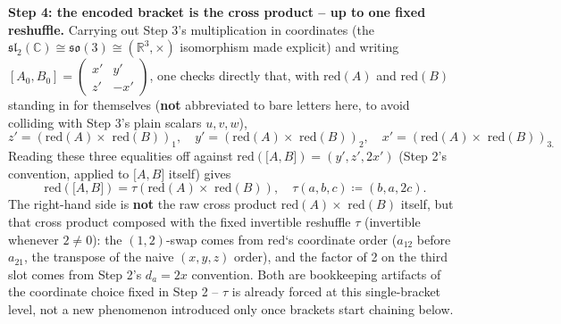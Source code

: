 \documentclass[a4paper,11pt]{scrartcl}
\begin{document}
\textbf{Step 4: the encoded bracket is the cross product -- up to one fixed reshuffle.} Carrying out Step 3's multiplication in coordinates (the \(\mathfrak{sl}_{2}({\mathbb{C}}) \cong \mathfrak{so}(3) \cong \left( \mathbb{R}^{3}, \times \right)\) isomorphism made explicit) and writing \(\left\lbrack A_{0},B_{0} \right\rbrack = \begin{pmatrix}
x' & y' \\
z' & - x'
\end{pmatrix}\), one checks directly that, with \(\text{red}(A)\) and \(\text{red}(B)\) standing in for themselves (\textbf{not} abbreviated to bare letters here, to avoid colliding with Step 3's plain scalars \(u,v,w\)), \[z' = \left( \text{red}(A) \times \text{ red}(B) \right)_{1},\quad y' = \left( \text{red}(A) \times \text{ red}(B) \right)_{2},\quad x' = \left( \text{red}(A) \times \text{ red}(B) \right)_{3.}\] Reading these three equalities off against \(\text{red}\left( \lbrack A,B\rbrack \right) = (y',z',2x')\) (Step 2's convention, applied to \(\lbrack A,B\rbrack\) itself) gives \[\text{ red}\left( \lbrack A,B\rbrack \right) = \tau(\text{red}(A) \times \text{ red}(B)),\quad\tau(a,b,c) ≔ (b,a,2c).\] The right-hand side is \textbf{not} the raw cross product \(\text{red}(A) \times \text{ red}(B)\) itself, but that cross product composed with the fixed invertible reshuffle \(\tau\) (invertible whenever \(2 \neq 0\)): the \((1,2)\)-swap comes from \(\text{red}\)`s coordinate order (\(a_{12}\) before \(a_{21}\), the transpose of the naive \((x,y,z)\) order), and the factor of 2 on the third slot comes from Step 2's \(d_{a} = 2x\) convention. Both are bookkeeping artifacts of the coordinate choice fixed in Step 2 -- \(\tau\) is already forced at this single-bracket level, not a new phenomenon introduced only once brackets start chaining below.
\end{document}
